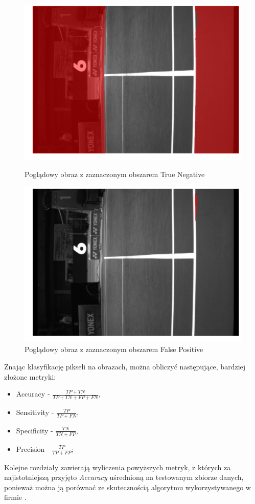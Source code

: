 \begin{figure}[!htb]
    \includegraphics[width=\linewidth]{TN_frame_8.jpg}
    \caption{Poglądowy obraz z zaznaczonym obszarem True Negative}
  \endminipage\hfill
    \includegraphics[width=\linewidth]{FP_frame_8.jpg}
    \caption{Poglądowy obraz z zaznaczonym obszarem False Positive}
  \endminipage\hfill
\end{figure}

Znając klasyfikację pikseli na obrazach, można obliczyć następujące, bardziej złożone metryki:

\begin{itemize}
  \label{sec:miary}
  \item Accuracy - $ \frac{TP + TN}{TP + TN + FP + FN} $,
  \item Sensitivity - $ \frac{TP}{TP + FN} $,
  \item Specificity - $ \frac{TN}{TN + FP} $,
  \item Precision - $ \frac{TP}{TP + FP} $;
\end{itemize}

Kolejne rozdziały zawierają wyliczenia powyższych metryk, z których za najistotniejszą przyjęto \textit{Accuracy} uśrednioną na testowanym zbiorze danych, ponieważ można ją porównać ze skutecznością algorytmu wykorzystywanego w firmie \blue{}.
